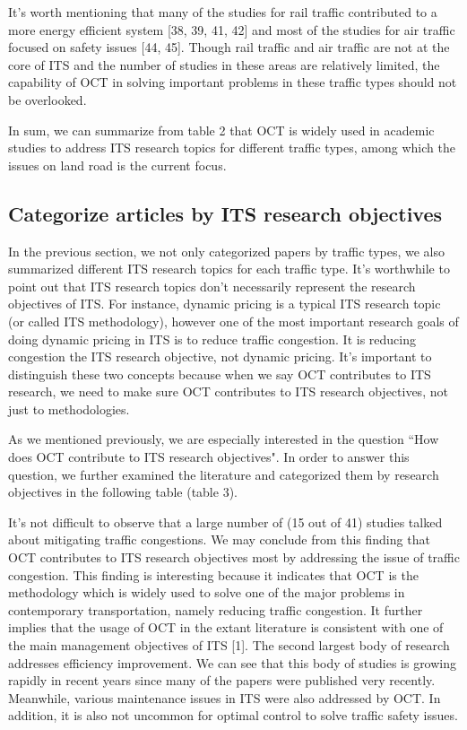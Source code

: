 \documentclass[12pt,onecolumn,twoside]{JCTA}
\theoremstyle{mystyle}
\begin{document}
It{\textquoteright}s worth mentioning that many of the studies for rail traffic contributed to a more energy efficient system [38, 39, 41, 42] and most of the studies for air traffic focused on safety issues [44, 45]. Though rail traffic and air traffic are not at the core of ITS and the number of studies in these areas are relatively limited, the capability of OCT in solving important problems in these traffic types should not be overlooked.

In sum, we can summarize from table 2 that OCT is widely used in academic studies to address ITS research topics for different traffic types, among which the issues on land road is the current focus.

\subsection{Categorize articles by ITS research objectives}
In the previous section, we not only categorized papers by traffic types, we also summarized different ITS research topics for each traffic type. It{\textquoteright}s worthwhile to point out that ITS research topics don{\textquoteright}t necessarily represent the research objectives of ITS. For instance, dynamic pricing is a typical ITS research topic (or called ITS methodology), however one of the most important research goals of doing dynamic pricing in ITS is to reduce traffic congestion. It is reducing congestion the ITS research objective, not dynamic pricing. It{\textquoteright}s important to distinguish these two concepts because when we say OCT contributes to ITS research, we need to make sure OCT contributes to ITS research objectives, not just to methodologies.

As we mentioned previously, we are especially interested in the question ``How does OCT contribute to ITS research objectives". In order to answer this question, we further examined the literature and categorized them by research objectives in the following table (table 3).

It{\textquoteright}s not difficult to observe that a large number of (15 out of 41) studies talked about mitigating traffic congestions. We may conclude from this finding that OCT contributes to ITS research objectives most by addressing the issue of traffic congestion. This finding is interesting because it indicates that OCT is the methodology which is widely used to solve one of the major problems in contemporary transportation, namely reducing traffic congestion. It further implies that the usage of OCT in the extant literature is consistent with one of the main management objectives of ITS [1]. The second largest body of research addresses efficiency improvement. We can see that this body of studies is growing rapidly in recent years since many of the papers were published very recently. Meanwhile, various maintenance issues in ITS were also addressed by OCT. In addition, it is also not uncommon for optimal control to solve traffic safety issues.\\\\\\
\end{document}
